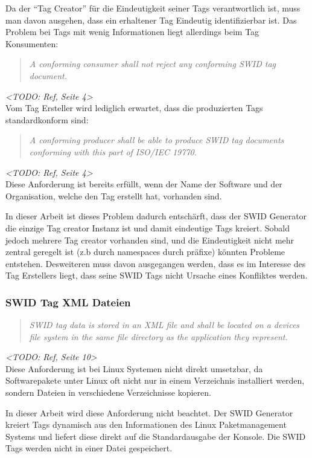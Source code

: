 Da der \enquote{Tag Creator} für die Eindeutigkeit seiner Tags verantwortlich
ist, muss man davon ausgehen, dass ein erhaltener Tag Eindeutig identifizierbar
ist. Das Problem bei Tags mit wenig Informationen liegt allerdings beim Tag
Konsumenten:
\begin{quote}
\textit{A conforming consumer shall not reject any conforming SWID tag
document.}
\end{quote}
\textit{<TODO: Ref, Seite 4>}\\

Vom Tag Ersteller wird lediglich erwartet, dass die produzierten Tags
standardkonform sind:
\begin{quote}
\textit{A conforming producer shall be able to produce SWID tag documents
conforming with this part of ISO/IEC 19770.}
\end{quote}
\textit{<TODO: Ref, Seite 4>}\\

Diese Anforderung ist bereits erfüllt, wenn der Name der Software und der Organisation, welche den Tag erstellt hat, vorhanden sind.

In dieser Arbeit ist dieses Problem dadurch entschärft, dass der SWID
Generator die einzige Tag creator Instanz ist und damit eindeutige Tags kreiert. Sobald jedoch mehrere Tag creator vorhanden sind, und die Eindeutigkeit nicht mehr zentral geregelt ist (z.b durch namespaces durch präfixe) könnten Probleme entstehen. Desweiteren muss davon ausgegangen werden, dass es im Interesse des Tag Erstellers liegt, dass seine SWID Tags nicht Ursache eines Konfliktes werden.

\subsubsection{SWID Tag XML Dateien}
\begin{quote}
\textit{SWID tag data is stored in an XML file and shall be located on a devices
file system in the same file directory as the application they represent.}
\end{quote}
\textit{<TODO: Ref, Seite 10>}\\

Diese Anforderung ist bei Linux Systemen nicht direkt umsetzbar, da
Softwarepakete unter Linux oft nicht nur in einem Verzeichnis installiert
werden, sondern Dateien in verschiedene Verzeichnisse kopieren.

In dieser Arbeit wird diese Anforderung nicht beachtet. Der SWID Generator
kreiert Tags dynamisch aus den Informationen des Linux Paketmanagement Systems
und liefert diese direkt auf die Standardausgabe der Konsole. Die SWID Tags
werden nicht in einer Datei gespeichert. 

